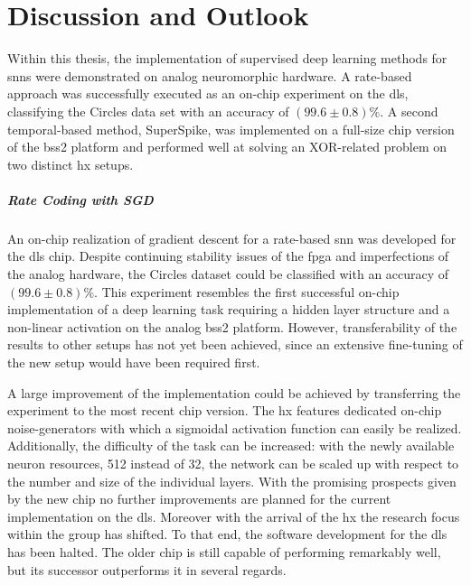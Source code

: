 \vspace{-1cm}
\chapter{Discussion and Outlook}
\label{discussionandoutlook}
\vspace{-0.5cm}
Within this thesis, the implementation of supervised deep learning methods for \glspl{snn} were demonstrated on analog neuromorphic hardware. A rate-based approach was successfully executed as an on-chip experiment on the \gls{dls}, classifying the Circles data set with an accuracy of $(99.6 \pm 0.8) \%$. A second temporal-based method, SuperSpike, was implemented on a full-size chip version of the \gls{bss2} platform and performed well at solving an XOR-related problem on two distinct \gls{hx} setups.

\paragraph{Rate Coding with SGD} An on-chip realization of gradient descent for a rate-based \gls{snn} was developed for the \gls{dls} chip. Despite continuing stability issues of the \gls{fpga} and imperfections of the analog hardware, the Circles dataset could be classified with an accuracy of $(99.6 \pm 0.8) \%$. This experiment resembles the first successful on-chip implementation of a deep learning task requiring a hidden layer structure and a non-linear activation on the analog \gls{bss2} platform. However, transferability of the results to other setups has not yet been achieved, since an extensive fine-tuning of the new setup would have been required first.

A large improvement of the implementation could be achieved by transferring the experiment to the most recent chip version. The \gls{hx} features dedicated on-chip noise-generators with which a sigmoidal activation function can easily be realized. Additionally, the difficulty of the task can be increased: with the newly available neuron resources, 512 instead of 32, the network can be scaled up with respect to the number and size of the individual layers. With the promising prospects given by the new chip no further improvements are planned for the current implementation on the \gls{dls}. Moreover with the arrival of the \gls{hx} the research focus within the group has shifted. To that end, the software development for the \gls{dls} has been halted. The older chip is still capable of performing remarkably well, but its successor outperforms it in several regards.

